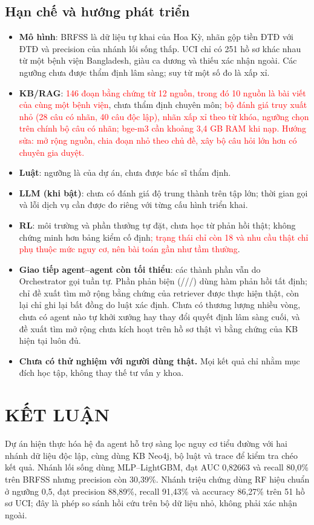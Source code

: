 \documentclass[12pt,a4paper]{report}
\newcommand{\code}[1]{{\small\path{#1}}}
\newcommand{\capnhat}[1]{\textcolor{red}{#1}}
\begin{document}
\section{Hạn chế và hướng phát triển}
\begin{itemize}[nosep]
\item \textbf{Mô hình}: BRFSS là dữ liệu tự khai của Hoa Kỳ, nhãn gộp tiền ĐTĐ với ĐTĐ và precision của nhánh lối sống thấp. UCI chỉ có 251 hồ sơ khác nhau từ một bệnh viện Bangladesh, giàu ca dương và thiếu xác nhận ngoài. Các ngưỡng chưa được thẩm định lâm sàng; \code{HighBP} suy từ một số đo là xấp xỉ.
\item \textbf{KB/RAG}: \capnhat{146 đoạn bằng chứng từ 12 nguồn, trong đó 10 nguồn là bài viết của cùng một bệnh viện}, chưa thẩm định chuyên môn; \capnhat{bộ đánh giá truy xuất nhỏ (28 câu có nhãn, 40 câu độc lập), nhãn xấp xỉ theo từ khóa, ngưỡng chọn trên chính bộ câu có nhãn; bge-m3 cần khoảng 3,4 GB RAM khi nạp. Hướng sửa: mở rộng nguồn, chia đoạn nhỏ theo chủ đề, xây bộ câu hỏi lớn hơn có chuyên gia duyệt.}
\item \textbf{Luật}: ngưỡng là của dự án, chưa được bác sĩ thẩm định.
\item \textbf{LLM (khi bật)}: chưa có đánh giá độ trung thành trên tập lớn; thời gian gọi và lỗi dịch vụ cần được đo riêng với từng cấu hình triển khai.
\item \textbf{RL}: môi trường và phần thưởng tự đặt, chưa học từ phản hồi thật; không chứng minh hơn bảng kiểm cố định\capnhat{; trạng thái chỉ còn 18 và nhu cầu thật chỉ phụ thuộc mức nguy cơ, nên bài toán gần như tầm thường}.
\item \textbf{Giao tiếp agent--agent còn tối thiểu}: các thành phần vẫn do Orchestrator gọi tuần tự. Phần phản biện (\code{challenge}/\code{accept}/\code{propose}/\code{inform}) dùng hàm phản hồi tất định; chỉ đề xuất tìm mở rộng bằng chứng của retriever được thực hiện thật, còn lại chỉ ghi lại bất đồng do luật xác định. Chưa có thương lượng nhiều vòng, chưa có agent nào tự khởi xướng hay thay đổi quyết định lâm sàng cuối, và đề xuất tìm mở rộng chưa kích hoạt trên hồ sơ thật vì bằng chứng của KB hiện tại luôn đủ. 
\item \textbf{Chưa có thử nghiệm với người dùng thật.} Mọi kết quả chỉ nhằm mục đích học tập, không thay thế tư vấn y khoa.
\end{itemize}


\chapter*{KẾT LUẬN}
Dự án hiện thực hóa hệ đa agent hỗ trợ sàng lọc nguy cơ tiểu đường với hai nhánh dữ liệu độc lập, cùng dùng KB Neo4j, bộ luật và trace để kiểm tra chéo kết quả. Nhánh lối sống dùng MLP--LightGBM, đạt AUC 0,82663 và recall 80,0\% trên BRFSS nhưng precision còn 30,39\%. Nhánh triệu chứng dùng RF hiệu chuẩn ở ngưỡng 0,5, đạt precision 88,89\%, recall 91,43\% và accuracy 86,27\% trên 51 hồ sơ UCI; đây là phép so sánh hồi cứu trên bộ dữ liệu nhỏ, không phải xác nhận ngoài.
\end{document}
